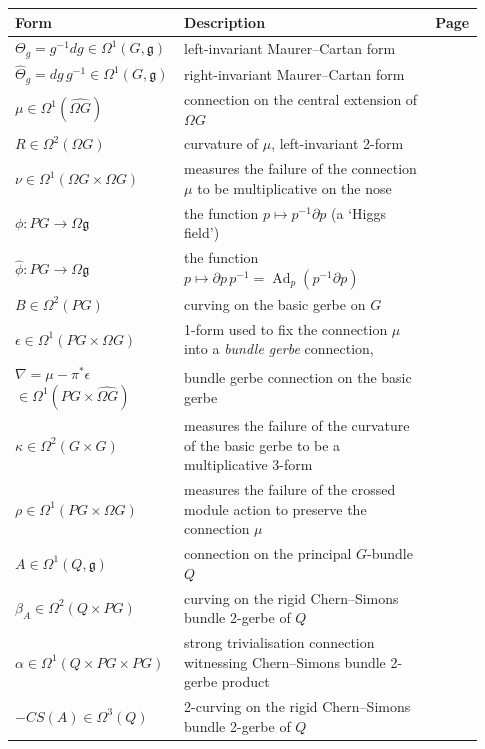 \documentclass[12pt]{amsart}
\DeclareMathOperator{\Ad}{Ad}
\theoremstyle{plain}
\theoremstyle{definition}
\theoremstyle{remark}
\numberwithin{equation}{section}
\newcommand{\g}{\mathfrak g}
\newcommand{\fg}{\mathfrak g}
\newcommand{\<}{\langle}
\renewcommand{\>}{\rangle}
\newcommand{\Omegahat}[1]{\widehat{\Omega #1}}
\newcommand{\Thetahat}{\widehat{\Theta}}
\newcommand{\phihat}{\widehat{\phi}}
\newcommand{\lMC}[1]{#1^{-1}d#1}
\newcommand{\rMC}[1]{d#1\,#1^{-1}}
\newcommand{\phifun}[1]{#1^{-1}\partial #1}
\newcommand{\phihatfun}[1]{\partial #1\,#1^{-1}}
\begin{document}
\renewcommand{\arraystretch}{1.4}
\begin{tabular}{p{0.3\linewidth} p{0.53\linewidth} p{0.1\linewidth}}
      Form  & Description & Page \\ 
      \hline
      $\Theta_g = \lMC{g} \in \Omega^1(G,\fg)$ & left-invariant Maurer--Cartan form &\\
      $\Thetahat_g = \rMC{g} \in \Omega^1(G,\fg)$ & right-invariant Maurer--Cartan form & \\
      $\mu\in \Omega^1(\widehat{\Omega G})$ & connection on the central extension of $\Omega G$ & \pageref{form:central extension connection}\\
      $R\in \Omega^2(\Omega G)$ & curvature of $\mu$, left-invariant 2-form  & \pageref{form:central extension curvature}\\
      $\nu \in \Omega^1(\Omega G\times \Omega G)$ & measures the failure of the connection $\mu$ to be multiplicative on the nose &\pageref{form:nu}\\
      $\phi\colon PG\to \Omega \fg$&the function $p\mapsto \phifun{p}$ (a `Higgs field')&\\
      $\phihat\colon PG\to \Omega \fg$ & the function $p\mapsto \phihatfun{p} = \Ad_p(\phifun{p})$ &\\
      $B \in \Omega^2(PG)$ & curving on the basic gerbe on $G$ & \pageref{form: basic gerbe curving}\\
      $\epsilon \in \Omega^1(PG\times \Omega G)$& 1-form used to fix the connection $\mu$ into a \emph{bundle gerbe} connection,& \pageref{form:basic gerbe connection fix-up form}\\
      $\nabla = \mu - \pi^*\epsilon$ \newline\phantom{xxxx} $\in \Omega^1(PG\times \Omegahat{G})$ &bundle gerbe connection on the basic gerbe &  \pageref{form:basic gerbe connection}\\
      $\kappa \in \Omega^2(G\times G)$ & measures the failure of the curvature of the basic gerbe to be a multiplicative 3-form& \pageref{form:kappa}\\
      $\rho \in \Omega^1(PG\times \Omega G)$ & measures the failure of the crossed module action to preserve the connection $\mu$ & \pageref{form:xmod form rho} \\
      $A\in \Omega^1(Q,\g)$ & connection on the principal $G$-bundle $Q$ &\\
      $\beta_A \in \Omega^2(Q\times PG)$ &  curving on the rigid Chern--Simons bundle 2-gerbe of $Q$& \pageref{form:CS2-gerbe curving}\\
      $\alpha \in \Omega^1(Q\times PG\times PG)$ &strong trivialisation connection witnessing Chern--Simons bundle 2-gerbe product&\pageref{form:CS2-gerbe alpha}\\
      $-CS(A)\in \Omega^3(Q)$ &2-curving on the rigid Chern--Simons bundle 2-gerbe of $Q$ & \pageref{form:CS2-gerbe 2-curving}\\
      \hline
    \end{tabular}
    \label{tab:my_label}
\end{document}
